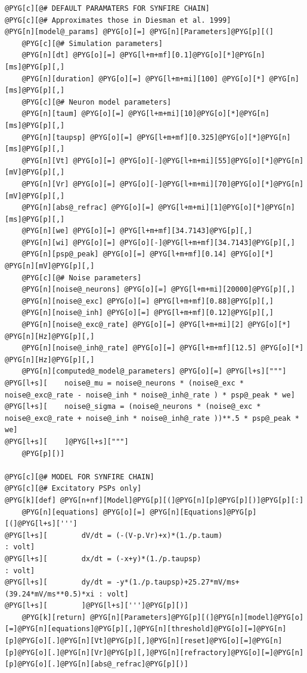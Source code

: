 \documentclass[letterpaper,10pt,english]{manual}
\begin{document}
\begin{Verbatim}[commandchars=@\[\]]
@PYG[c][@# DEFAULT PARAMATERS FOR SYNFIRE CHAIN]
@PYG[c][@# Approximates those in Diesman et al. 1999]
@PYG[n][model@_params] @PYG[o][=] @PYG[n][Parameters]@PYG[p][(]
    @PYG[c][@# Simulation parameters]
    @PYG[n][dt] @PYG[o][=] @PYG[l+m+mf][0.1]@PYG[o][*]@PYG[n][ms]@PYG[p][,]
    @PYG[n][duration] @PYG[o][=] @PYG[l+m+mi][100] @PYG[o][*] @PYG[n][ms]@PYG[p][,]
    @PYG[c][@# Neuron model parameters]
    @PYG[n][taum] @PYG[o][=] @PYG[l+m+mi][10]@PYG[o][*]@PYG[n][ms]@PYG[p][,]
    @PYG[n][taupsp] @PYG[o][=] @PYG[l+m+mf][0.325]@PYG[o][*]@PYG[n][ms]@PYG[p][,]
    @PYG[n][Vt] @PYG[o][=] @PYG[o][-]@PYG[l+m+mi][55]@PYG[o][*]@PYG[n][mV]@PYG[p][,]
    @PYG[n][Vr] @PYG[o][=] @PYG[o][-]@PYG[l+m+mi][70]@PYG[o][*]@PYG[n][mV]@PYG[p][,]
    @PYG[n][abs@_refrac] @PYG[o][=] @PYG[l+m+mi][1]@PYG[o][*]@PYG[n][ms]@PYG[p][,]
    @PYG[n][we] @PYG[o][=] @PYG[l+m+mf][34.7143]@PYG[p][,]
    @PYG[n][wi] @PYG[o][=] @PYG[o][-]@PYG[l+m+mf][34.7143]@PYG[p][,]
    @PYG[n][psp@_peak] @PYG[o][=] @PYG[l+m+mf][0.14] @PYG[o][*] @PYG[n][mV]@PYG[p][,]
    @PYG[c][@# Noise parameters]
    @PYG[n][noise@_neurons] @PYG[o][=] @PYG[l+m+mi][20000]@PYG[p][,]
    @PYG[n][noise@_exc] @PYG[o][=] @PYG[l+m+mf][0.88]@PYG[p][,]
    @PYG[n][noise@_inh] @PYG[o][=] @PYG[l+m+mf][0.12]@PYG[p][,]
    @PYG[n][noise@_exc@_rate] @PYG[o][=] @PYG[l+m+mi][2] @PYG[o][*] @PYG[n][Hz]@PYG[p][,]
    @PYG[n][noise@_inh@_rate] @PYG[o][=] @PYG[l+m+mf][12.5] @PYG[o][*] @PYG[n][Hz]@PYG[p][,]
    @PYG[n][computed@_model@_parameters] @PYG[o][=] @PYG[l+s]["""]
@PYG[l+s][    noise@_mu = noise@_neurons * (noise@_exc * noise@_exc@_rate - noise@_inh * noise@_inh@_rate ) * psp@_peak * we]
@PYG[l+s][    noise@_sigma = (noise@_neurons * (noise@_exc * noise@_exc@_rate + noise@_inh * noise@_inh@_rate ))**.5 * psp@_peak * we]
@PYG[l+s][    ]@PYG[l+s]["""]
    @PYG[p][)]

@PYG[c][@# MODEL FOR SYNFIRE CHAIN]
@PYG[c][@# Excitatory PSPs only]
@PYG[k][def] @PYG[n+nf][Model]@PYG[p][(]@PYG[n][p]@PYG[p][)]@PYG[p][:]
    @PYG[n][equations] @PYG[o][=] @PYG[n][Equations]@PYG[p][(]@PYG[l+s][''']
@PYG[l+s][        dV/dt = (-(V-p.Vr)+x)*(1./p.taum)                          : volt]
@PYG[l+s][        dx/dt = (-x+y)*(1./p.taupsp)                               : volt]
@PYG[l+s][        dy/dt = -y*(1./p.taupsp)+25.27*mV/ms+(39.24*mV/ms**0.5)*xi : volt]
@PYG[l+s][        ]@PYG[l+s][''']@PYG[p][)]
    @PYG[k][return] @PYG[n][Parameters]@PYG[p][(]@PYG[n][model]@PYG[o][=]@PYG[n][equations]@PYG[p][,]@PYG[n][threshold]@PYG[o][=]@PYG[n][p]@PYG[o][.]@PYG[n][Vt]@PYG[p][,]@PYG[n][reset]@PYG[o][=]@PYG[n][p]@PYG[o][.]@PYG[n][Vr]@PYG[p][,]@PYG[n][refractory]@PYG[o][=]@PYG[n][p]@PYG[o][.]@PYG[n][abs@_refrac]@PYG[p][)]


\end{Verbatim}
\end{document}
